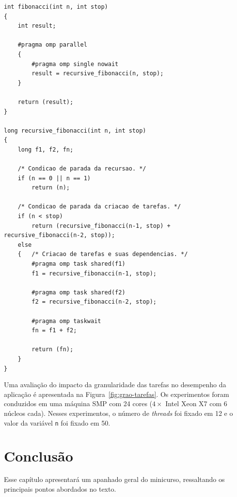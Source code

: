 \documentclass{SBCbookchapter}
\begin{document}
\begin{lstlisting}[frame=single, caption=Exemplo de uma implementação recursiva simples da soma da sequencia de Fibonacci
usando tarefas., label=listing:fibonacci]
int fibonacci(int n, int stop)
{
	int result;
	
	#pragma omp parallel
  	{
		#pragma omp single nowait
		result = recursive_fibonacci(n, stop);
	}
		
	return (result);
}

long recursive_fibonacci(int n, int stop)
{
	long f1, f2, fn;

	/* Condicao de parada da recursao. */
	if (n == 0 || n == 1) 
		return (n);

	/* Condicao de parada da criacao de tarefas. */
	if (n < stop) 
		return (recursive_fibonacci(n-1, stop) + recursive_fibonacci(n-2, stop));
	else
	{	/* Criacao de tarefas e suas dependencias. */
		#pragma omp task shared(f1)
		f1 = recursive_fibonacci(n-1, stop);

		#pragma omp task shared(f2)
		f2 = recursive_fibonacci(n-2, stop);
		
		#pragma omp taskwait
		fn = f1 + f2;
			
		return (fn);
	}
}
\end{lstlisting}

	Uma avaliação do impacto da granularidade das tarefas no desempenho da aplicação é apresentada na
	Figura~\ref{fig:grao-tarefas}. Os experimentos foram conduzidos em uma máquina SMP com 24 cores
	($4 \times$ Intel Xeon X7 com 6 núcleos cada). Nesses experimentos, o número de \textit{threads} foi fixado
	em 12 e o valor da variável \texttt{n} foi fixado em 50.


\section{Conclusão}

	Esse capítulo apresentará um apanhado geral do minicurso, ressaltando os
	principais pontos abordados no texto.


\end{document}
